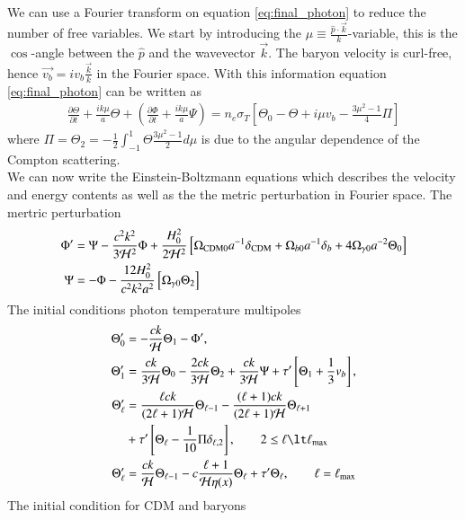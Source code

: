 \documentclass{aa}
\begin{document}
\\
We can use a Fourier transform on equation \eqref{eq:final_photon} to reduce the number of free variables. We start by introducing the $\mu \equiv \frac{\hat{p}\cdot \vec{k}}{k}$-variable, this is the $\cos$-angle between the $\hat{p}$ and the wavevector $\vec{k}$. The baryon velocity is curl-free, hence $\vec{v_b} = iv_b \frac{\vec{k}}{k}$ in the Fourier space. With this information equation \eqref{eq:final_photon} can be written as
\begin{align}
    \frac{\partial \Theta}{\partial t} + \frac{ik\mu}{a} \Theta + (\frac{\partial \Phi}{\partial t} + \frac{i k\mu}{a}\Psi) = n_e \sigma_T[\Theta_0 - \Theta + i\mu v_b - \frac{3\mu^2-1}{4}\Pi] 
\end{align}
where $\Pi = \Theta_2 = -\frac{1}{2}\int_{-1}^1\Theta \frac{3\mu^2-1}{2}d\mu$ is due to the angular dependence of the Compton scattering.\\
We can now write the Einstein-Boltzmann equations which describes the velocity and energy contents as well as the the metric perturbation in Fourier space.
The mertric perturbation 
\begin{align}
\Phi^\prime &= \Psi - \frac{c^2k^2}{3\mathcal{H}^2} \Phi + \frac{H_0^2}{2\mathcal{H}^2}
\left[\Omega_{\rm CDM 0} a^{-1} \delta_{\rm CDM} + \Omega_{b 0} a^{-1} \delta_b + 4\Omega_{\gamma 0}
a^{-2}\Theta_0 \right] \\
\Psi &= -\Phi - \frac{12H_0^2}{c^2k^2a^2}\left[\Omega_{\gamma 0}\Theta_2\right]
\end{align}
The initial conditions  photon temperature multipoles 
\begin{align}
\Theta^\prime_0 &= -\frac{ck}{\mathcal{H}} \Theta_1 - \Phi^\prime, \\
\Theta^\prime_1 &=  \frac{ck}{3\mathcal{H}} \Theta_0 - \frac{2ck}{3\mathcal{H}}\Theta_2 +
\frac{ck}{3\mathcal{H}}\Psi + \tau^\prime\left[\Theta_1 + \frac{1}{3}v_b\right], \\
\Theta^\prime_\ell &= \frac{\ell ck}{(2\ell+1)\mathcal{H}}\Theta_{\ell-1} - \frac{(\ell+1)ck}{(2\ell+1)\mathcal{H}}
\Theta_{\ell+1} \notag \\
&+ \tau^\prime\left[\Theta_\ell - \frac{1}{10}\Pi
\delta_{\ell,2}\right], \quad\quad 2 \le \ell \lt \ell_{\textrm{max}} \\
\Theta_{\ell}^\prime &= \frac{ck}{\mathcal{H}}
\Theta_{\ell-1}-c\frac{\ell+1}{\mathcal{H}\eta(x)}\Theta_\ell+\tau^\prime\Theta_\ell,
\quad\quad \ell = \ell_{\textrm{max}}
\end{align}
The initial condition for CDM and baryons
\end{document}
